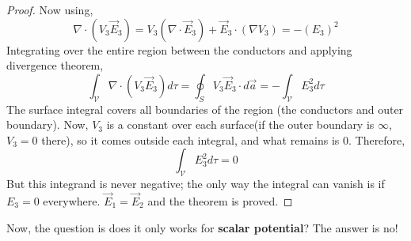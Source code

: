 \documentclass{article}
\begin{document}
\begin{proof}
    Now using,
    \begin{equation*}
        \nabla \cdot (V_3 \vec{E}_3) = V_3 (\nabla \cdot \vec{E}_3) + \vec{E}_3 \cdot (\nabla V_3) = -(E_3)^2
    \end{equation*}
    Integrating over the entire region between the conductors and applying divergence theorem,
    \begin{equation}
        \int_{\mathcal{V}}\nabla\cdot (V_3 \vec{E}_3)d\tau = \oint_S V_3 \vec{E}_3 \cdot d\vec{a} = -\int_\mathcal{V} E_3^2 d\tau
    \end{equation}
    The surface integral covers all boundaries of the region (the conductors and outer boundary). Now, $V_3$ is a constant over each surface(if the outer boundary is $\infty$, $V_3=0$ there), so it comes outside each integral, and what remains is $0$. Therefore,
    \begin{equation*}
        \int_{\mathcal{V}} E_3^2 d\tau = 0
    \end{equation*}
    But this integrand is never negative; the only way the integral can vanish is if $E_3=0$ everywhere. $\vec{E}_1=\vec{E}_2$ and the theorem is proved.
\end{proof}
Now, the question is does it only works for \textbf{scalar potential}? The answer is no!
\end{document}
